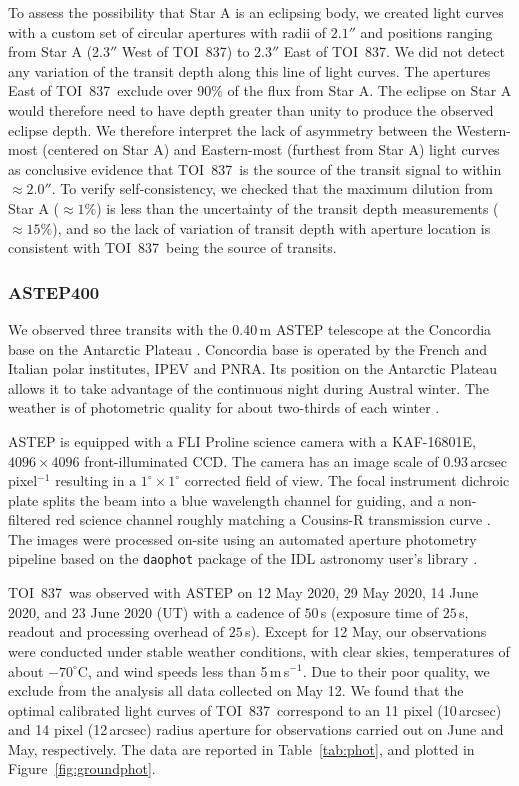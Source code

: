 \documentclass[12pt,twocolumn,tighten]{aastex63}
\newcommand{\tn}{TOI~837} %
\begin{document}
To assess the possibility that Star A is an eclipsing body, we created
light curves with a custom set of circular apertures with radii of
$2.1''$ and positions ranging from Star A (2.3$''$ West of \tn) to
2.3$''$ East of \tn.  We did not detect any variation of the transit
depth along this line of light curves. The apertures East of \tn\
exclude over 90\% of the flux from Star A.  The eclipse on Star A
would therefore need to have depth greater than unity to produce the
observed eclipse depth.  We therefore interpret the lack of asymmetry
between the Western-most (centered on Star A) and Eastern-most
(furthest from Star A) light curves as conclusive evidence that \tn\
is the source of the transit signal to within $\approx2.0''$.  To
verify self-consistency, we checked that the maximum dilution from
Star A ($\approx 1\%$) is less than the uncertainty of the transit
depth measurements ($\approx 15\%$), and so the lack of variation of
transit depth with aperture location is consistent with \tn\ being the
source of transits.



\subsubsection{ASTEP400}

We observed three transits with the 0.40$\,$m ASTEP telescope at the
Concordia base on the Antarctic Plateau \citep{daban_astep_2010}.
Concordia base is operated by the French and Italian polar
institutes, IPEV and PNRA.  Its position on the Antarctic Plateau
allows it to take advantage of the continuous night during Austral
winter.  The weather is of photometric quality for about two-thirds of
each winter \citep{crouzet_four_2018}.

ASTEP is equipped with a FLI Proline science camera with a KAF-16801E,
$4096\times4096$ front-illuminated CCD. The camera has an image scale
of 0.93\,arcsec pixel$^{-1}$ resulting in a $1^{\circ}\times1^{\circ}$
corrected field of view. The focal instrument dichroic plate splits
the beam into a blue wavelength channel for guiding, and a
non-filtered red science channel roughly matching a Cousins-R
transmission curve
\citep{abe_secondary_2013,mekarnia_transiting_2016}.  The images were
processed on-site using an automated aperture  photometry pipeline
based on the \texttt{daophot} package of the IDL astronomy user's
library \citep{landsman_1995}.

\tn\ was observed with ASTEP on 12 May 2020, 29 May 2020, 14 June
2020, and 23 June 2020 (UT) with a cadence of $50\,$s (exposure time
of $25\,$s, readout and processing overhead of $25\,$s).  Except for
12 May, our observations were conducted under stable weather
conditions, with clear skies, temperatures of about $-70^\circ$C, and
wind speeds less than 5\,m$\,$s$^{-1}$. Due to their poor quality, we
exclude from the analysis all data collected on May 12. We found that
the optimal calibrated light curves of \tn\ correspond to an 11 pixel
(10\,arcsec) and 14 pixel (12\,arcsec) radius aperture for
observations carried out on June and May, respectively.  The data are
reported in Table~\ref{tab:phot}, and plotted in
Figure~\ref{fig:groundphot}.
\end{document}
